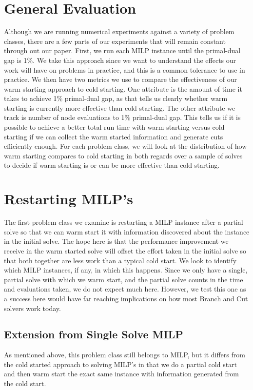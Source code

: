 \documentclass[10pt]{article}
\begin{document}
	\section{General Evaluation}\label{s:eval}
	Although we are running numerical experiments against a variety of problem classes, there are a few parts of our experiments that will remain constant through out our paper. First, we run each MILP instance until the primal-dual gap is 1\%. We take this approach since we want to understand the effects our work will have on problems in practice, and this is a common tolerance to use in practice. We then have two metrics we use to compare the effectiveness of our warm starting approach to cold starting. One attribute is the amount of time it takes to achieve 1\% primal-dual gap, as that tells us clearly whether warm starting is currently more effective than cold starting. The other attribute we track is number of node evaluations to 1\% primal-dual gap. This tells us if it is possible to achieve a better total run time with warm starting versus cold starting if we can collect the warm started information and generate cuts efficiently enough. For each problem class, we will look at the distribution of how warm starting compares to cold starting in both regards over a sample of solves to decide if warm starting is or can be more effective than cold starting.
	
	\section{Restarting MILP's}\label{s:restart}
	The first problem class we examine is restarting a MILP instance after a partial solve so that we can warm start it with information discovered about the instance in the initial solve. The hope here is that the performance improvement we receive in the warm started solve will offset the effort taken in the initial solve so that both together are less work than a typical cold start. We look to identify which MILP instances, if any, in which this happens. Since we only have a single, partial solve with which we warm start, and the partial solve counts in the time and evaluations taken, we do not expect much here. However, we test this one as a success here would have far reaching implications on how most Branch and Cut solvers work today.
	
	\subsection{Extension from Single Solve MILP}
	As mentioned above, this problem class still belongs to MILP, but it differs from the cold started approach to solving MILP's in that we do a partial cold start and then warm start the exact same instance with information generated from the cold start.
	
\end{document}
